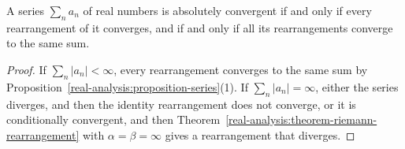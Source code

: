 \begin{corollary}\label{real-analysis:corollary-unconditional}
A series $\sum_na_n$ of real numbers is absolutely convergent if and only if every rearrangement of it converges, and if and only if all its rearrangements converge to the same sum.
\end{corollary}

\begin{proof}
If $\sum_n|a_n| < \infty$, every rearrangement converges to the same sum by Proposition~\ref{real-analysis:proposition-series}(1). If $\sum_n|a_n| = \infty$, either the series diverges, and then the
identity rearrangement does not converge, or it is conditionally convergent, and then Theorem~\ref{real-analysis:theorem-riemann-rearrangement} with $\alpha = \beta = \infty$ gives a rearrangement that
diverges.
\end{proof}

